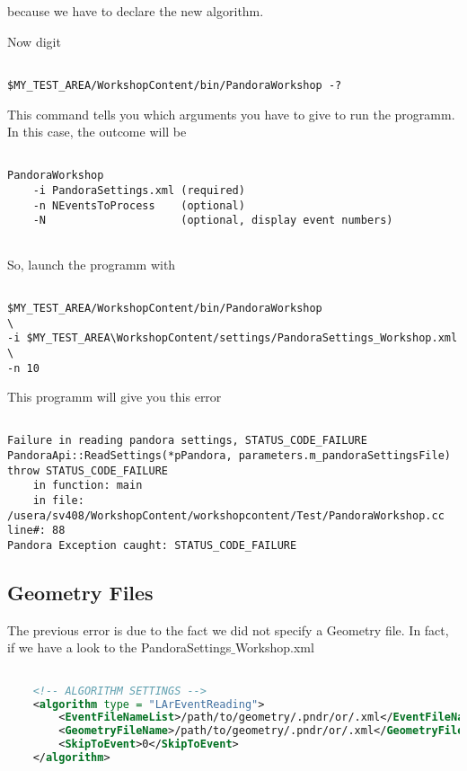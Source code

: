 because we have to declare the new algorithm.

Now digit

\begin{verbatim}

$MY_TEST_AREA/WorkshopContent/bin/PandoraWorkshop -?

\end{verbatim}

This command tells you which arguments you have to give to run the programm. In this case, the outcome will be

\begin{verbatim}

PandoraWorkshop 
    -i PandoraSettings.xml (required)
    -n NEventsToProcess    (optional)
    -N                     (optional, display event numbers)


\end{verbatim}

So, launch the programm with

\begin{verbatim}

$MY_TEST_AREA/WorkshopContent/bin/PandoraWorkshop                      \
-i $MY_TEST_AREA\WorkshopContent/settings/PandoraSettings_Workshop.xml \
-n 10

\end{verbatim}

This programm will give you this error

\begin{verbatim}

Failure in reading pandora settings, STATUS_CODE_FAILURE
PandoraApi::ReadSettings(*pPandora, parameters.m_pandoraSettingsFile) throw STATUS_CODE_FAILURE
    in function: main
    in file:     /usera/sv408/WorkshopContent/workshopcontent/Test/PandoraWorkshop.cc line#: 88
Pandora Exception caught: STATUS_CODE_FAILURE

\end{verbatim}

\subsection{Geometry Files} \label{sssec:geometry_files}

The previous error is due to the fact we did not specify a Geometry file. In fact, if we have a look to the PandoraSettings${\_}$Workshop.xml

\begin{lstlisting}[language=XML, caption=Python example]

    <!-- ALGORITHM SETTINGS -->
    <algorithm type = "LArEventReading">
        <EventFileNameList>/path/to/geometry/.pndr/or/.xml</EventFileNameList>
        <GeometryFileName>/path/to/geometry/.pndr/or/.xml</GeometryFileName>
        <SkipToEvent>0</SkipToEvent>
    </algorithm>

\end{lstlisting}

